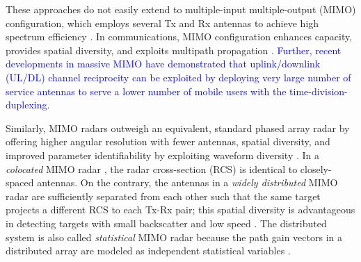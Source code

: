 \documentclass[10pt,journal]{IEEEtran}
\theoremstyle{definition}
\begin{document}
These approaches do not easily extend \cite{alaee2020information,dokhanchi2020multi} to multiple-input multiple-output (MIMO) configuration, which employs several Tx and Rx antennas to achieve high spectrum efficiency \cite{tse2005fundamentals,haimovich2008mimo}. %
In communications, MIMO configuration enhances capacity, provides spatial diversity, and exploits multipath propagation \cite{tse2005fundamentals}. \textcolor{blue}{Further, recent developments in massive MIMO \cite{Lops2020uplink,mishra2019toward} have demonstrated that uplink/downlink (UL/DL) channel reciprocity can be exploited by deploying very large number of service antennas to serve a lower number of mobile users with the time-division-duplexing.}

Similarly, MIMO radars outweigh an equivalent, standard phased array radar by offering higher angular resolution with fewer antennas, spatial diversity, and improved parameter identifiability by exploiting waveform diversity \cite{haimovich2008mimo}. %
In a \textit{colocated} MIMO radar \textcolor{red}{\cite{Eldar2020jointradarcomm,mishra2019cognitive}}, the radar cross-section (RCS) is identical to closely-spaced antennas. On the contrary, the antennas in a \textit{widely distributed} MIMO radar are sufficiently separated from each other such that the same target projects a different RCS to each Tx-Rx pair; this spatial diversity is advantageous in detecting targets with small backscatter and low speed \cite{hongbin_movingtarget,sun2019target}. The distributed system is also called \textit{statistical} MIMO radar because the path gain vectors in a distributed array are modeled as independent statistical variables \cite{hongbin_movingtarget,Jammer_game,NaghshTSP2017,sun2019target}. 
\end{document}
